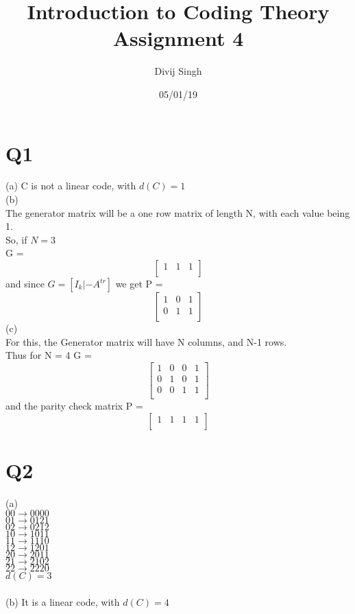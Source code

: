 \documentclass{article}
\title{Introduction to Coding Theory Assignment 4}
\author{Divij Singh}
\date{05/01/19}
\begin{document}
	\maketitle
	
	\section{Q1}
(a) C is not a linear code, with $d(C) = 1$\\
(b)\\
The generator matrix will be a one row matrix of length N, with each value being 1.\\
So, if $N=3$\\
G = 
\[
\begin{bmatrix}
1 & 1 & 1\\
\end{bmatrix}
\]
and since $G = [I_k | -A^{tr}]$ we get P =
\[
\begin{bmatrix}
1&0&1\\
0&1&1\\
\end{bmatrix}
\]
(c)\\
For this, the Generator matrix will have N columns, and N-1 rows.\\ Thus for N = 4 G =
\[
\begin{bmatrix}
1&0&0&1\\
0&1&0&1\\
0&0&1&1\\
\end{bmatrix}
\]
and the parity check matrix P = 
\[
\begin{bmatrix}
1&1&1&1\\
\end{bmatrix}
\]
\section{Q2}
(a)\\
$00 \rightarrow 0000$\\
$01 \rightarrow 0121$\\
$02 \rightarrow 0212$\\
$10 \rightarrow 1011$\\
$11 \rightarrow 1110$\\
$12 \rightarrow 1201$\\
$20 \rightarrow 2011$\\
$21 \rightarrow 2102$\\
$22 \rightarrow 2220$\\
$d(C) = 3$\\\\
(b) It is a linear code, with $d(C)= 4$
	
\end{document}
